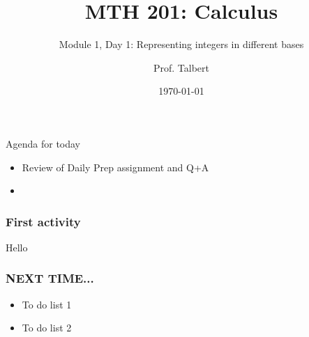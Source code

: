 \documentclass{beamer}
\title{MTH 201: Calculus}
\subtitle{Module 1, Day 1: Representing integers in different bases}
\author{Prof. Talbert}
\institute{GVSU}
\date{\today}
\begin{document}
\frame{\titlepage}


\begin{frame}{Agenda for today}
    \begin{itemize}
        \item<1-> Review of Daily Prep assignment and Q+A
        \item<2-> 
    \end{itemize}
\end{frame}

\begin{frame}
    \frametitle{First activity}

    Hello

\end{frame}

\begin{frame}
    \frametitle{NEXT TIME...}

    \begin{itemize}
        \item To do list 1
        \item To do list 2
    \end{itemize}

\end{frame}
\end{document}
